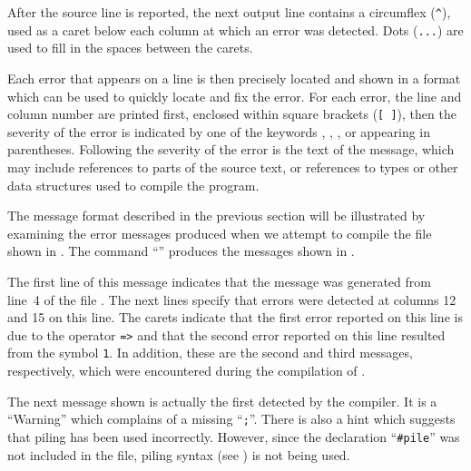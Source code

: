 After the source line is reported, the next output line contains a
circumflex (\verb+^+), used as a caret below each column at which an
error was detected.
Dots (\verb"...") are used to fill in the spaces between the carets.

Each error that appears on a line is then precisely located and shown
in a format which can be used to quickly locate and fix the error.
For each error, the line and column number are printed first,
enclosed within square brackets (\verb"[ ]"), then the severity of the
error is 
indicated by one of the keywords , ,
, or  appearing in parentheses.
Following the severity of the error is the text of the
message, which may include references to parts of the source text,
or references to types or other data structures used to compile the program.


The message format described in the previous section will be illustrated
by examining the error messages produced when we attempt to compile the file
 shown in .  The command
``'' produces the messages shown in
.



The first line of this message indicates that the message was generated
from line~4 of the file .  The next lines specify that
errors were detected at columns 12 and 15 on this line.  The carets
indicate that the first error reported on this line is due
to the operator {\tt =>} and that the second error reported on this line
resulted from the symbol {\tt 1}.
In addition, these are the second and third messages, respectively,
which were encountered during the compilation of .

The next message shown is actually the first detected by the compiler.
It is a ``Warning'' which complains of a missing ``\verb+;+''.
There is also a hint which suggests that piling has been used incorrectly.
However, since the declaration ``\verb+#pile+'' was not included in the file,
piling syntax (see ) is not being used.

